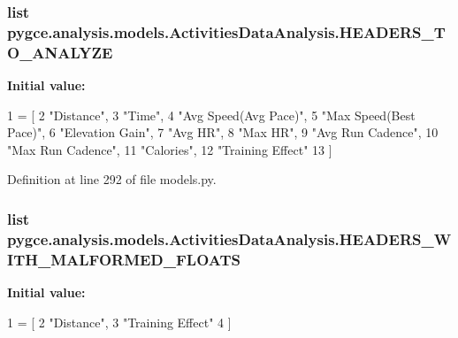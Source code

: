 \subsubsection[{\texorpdfstring{H\+E\+A\+D\+E\+R\+S\+\_\+\+T\+O\+\_\+\+A\+N\+A\+L\+Y\+ZE}{HEADERS_TO_ANALYZE}}]{\setlength{\rightskip}{0pt plus 5cm}list pygce.\+analysis.\+models.\+Activities\+Data\+Analysis.\+H\+E\+A\+D\+E\+R\+S\+\_\+\+T\+O\+\_\+\+A\+N\+A\+L\+Y\+ZE\hspace{0.3cm}{\ttfamily [static]}}\hypertarget{classpygce_1_1analysis_1_1models_1_1_activities_data_analysis_a799ad90125cc686b985fe525a3b33062}{}\label{classpygce_1_1analysis_1_1models_1_1_activities_data_analysis_a799ad90125cc686b985fe525a3b33062}
{\bfseries Initial value\+:}
\begin{DoxyCode}
1 = [
2         \textcolor{stringliteral}{"Distance"},
3         \textcolor{stringliteral}{"Time"},
4         \textcolor{stringliteral}{"Avg Speed(Avg Pace)"},
5         \textcolor{stringliteral}{"Max Speed(Best Pace)"},
6         \textcolor{stringliteral}{"Elevation Gain"},
7         \textcolor{stringliteral}{"Avg HR"},
8         \textcolor{stringliteral}{"Max HR"},
9         \textcolor{stringliteral}{"Avg Run Cadence"},
10         \textcolor{stringliteral}{"Max Run Cadence"},
11         \textcolor{stringliteral}{"Calories"},
12         \textcolor{stringliteral}{"Training Effect"}
13     ]
\end{DoxyCode}


Definition at line 292 of file models.\+py.

\subsubsection[{\texorpdfstring{H\+E\+A\+D\+E\+R\+S\+\_\+\+W\+I\+T\+H\+\_\+\+M\+A\+L\+F\+O\+R\+M\+E\+D\+\_\+\+F\+L\+O\+A\+TS}{HEADERS_WITH_MALFORMED_FLOATS}}]{\setlength{\rightskip}{0pt plus 5cm}list pygce.\+analysis.\+models.\+Activities\+Data\+Analysis.\+H\+E\+A\+D\+E\+R\+S\+\_\+\+W\+I\+T\+H\+\_\+\+M\+A\+L\+F\+O\+R\+M\+E\+D\+\_\+\+F\+L\+O\+A\+TS\hspace{0.3cm}{\ttfamily [static]}}\hypertarget{classpygce_1_1analysis_1_1models_1_1_activities_data_analysis_a272e010f956a64a8f916ebf1b9e14255}{}\label{classpygce_1_1analysis_1_1models_1_1_activities_data_analysis_a272e010f956a64a8f916ebf1b9e14255}
{\bfseries Initial value\+:}
\begin{DoxyCode}
1 = [
2         \textcolor{stringliteral}{"Distance"},
3         \textcolor{stringliteral}{"Training Effect"}
4     ]
\end{DoxyCode}


